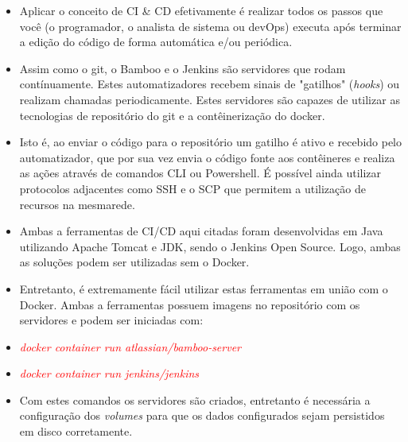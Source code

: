 \documentclass[10pt]{beamer}
\theoremstyle{remark}
\theoremstyle{definition}
\newcommand{\code}[1]{\textcolor{red} {\textit{#1}}} %
\begin{document}
\begin{frame}[allowframebreaks]
	\framebreak
	
	\begin{itemize}

		\item Aplicar o conceito de CI \& CD efetivamente é realizar todos os passos que você (o programador, o analista de sistema ou devOps) executa após terminar a edição do código de forma automática e/ou periódica.
		
		\item Assim como o git, o Bamboo e o Jenkins são servidores que rodam contínuamente. Estes automatizadores recebem sinais de "gatilhos" (\textit{hooks}) ou realizam chamadas periodicamente. Estes servidores são capazes de utilizar as tecnologias de repositório do git e a contêinerização do docker.
		
		\item Isto é, ao enviar o código para o repositório um gatilho é ativo e recebido pelo automatizador, que por sua vez envia o código fonte aos contêineres e realiza as ações através de comandos CLI ou Powershell. É possível ainda utilizar protocolos adjacentes como SSH e o SCP que permitem a utilização de recursos na mesmarede.
		
	\end{itemize}
	
	\framebreak
	
	\begin{itemize}
	
		\item Ambas a ferramentas de CI/CD aqui citadas foram desenvolvidas em Java utilizando Apache Tomcat e JDK, sendo o Jenkins Open Source. Logo, ambas as soluções podem ser utilizadas sem o Docker.
		
		\item Entretanto, é extremamente fácil utilizar estas ferramentas em união com o Docker. Ambas a ferramentas possuem imagens no repositório com os servidores e podem ser iniciadas com:
		
		\item \code{docker container run atlassian/bamboo-server}
		
		\item \code{docker container run jenkins/jenkins}
		
	\end{itemize}
	
	\framebreak
	
	\begin{itemize}
	
		\item Com estes comandos os servidores são criados, entretanto é necessária a configuração dos \textit{volumes} para que os dados configurados sejam persistidos em disco corretamente.
		

\end{itemize}
\end{frame}
\end{document}
